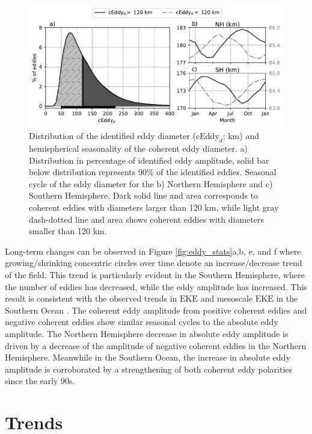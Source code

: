 \documentclass[draft,linenumbers]{agujournal2019}
\newcommand{\EKE}{\textrm{EKE}}
\newcommand{\cEddy}{\textrm{cEddy}}
\begin{document}
	\begin{figure}
	    \centering
	    \includegraphics[width=1\textwidth]{figures/eddy_diameter_seasonal.pdf}
	    \caption{Distribution of the identified eddy diameter ($\cEddy_d$; km) and hemispherical seasonality of the coherent eddy diameter. a) Distribution in percentage of identified eddy amplitude, solid bar below distribution represents 90\% of the identified eddies. Seasonal cycle of the eddy diameter for the b) Northern Hemisphere and c) Southern Hemisphere. Dark solid line and area corresponds to coherent eddies with diameters larger than 120 km, while light gray dash-dotted line and area shows coherent eddies with diameters smaller than 120 km.}
	    \label{fig:eddy_diameter}
	\end{figure}

	Long-term changes can be observed in Figure \ref{fig:eddy_stats}a,b, e, and f where growing/shrinking concentric circles over time denote an increase/decrease trend of the field. 
	This trend is particularly evident in the Southern Hemisphere, where the number of eddies has decreased, while the eddy amplitude has increased. 
	This result is consistent with the observed trends in $\EKE$ and mesoscale $\EKE$ in the Southern Ocean \citep{Hogg_Recent_2015, Martinez_TKE_2019}. The coherent eddy amplitude from positive coherent eddies and negative coherent eddies show similar seasonal cycles to the absolute eddy amplitude. The Northern Hemisphere decrease in absolute eddy amplitude is driven by a decrease of the amplitude of negative coherent eddies in the Northern Hemisphere. Meanwhile in the Southern Ocean, the increase in absolute eddy amplitude is corroborated by a strengthening of both coherent eddy polarities since the early 90s.

	\section{Trends}
	\label{sec:CE_trends}	
	
\end{document}
